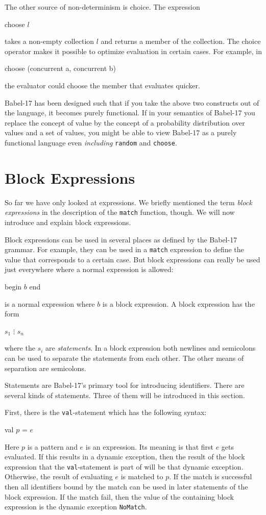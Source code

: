 \documentclass[11pt]{amsart}
\newcommand{\babelsrc}[1] {\lstinline!#1!}
\begin{document}
The other source of non-determinism is choice. The expression
\begin{babellisting}
choose $l$
\end{babellisting}
takes a non-empty collection $l$ and returns a member of the collection. The choice operator makes it possible to optimize evaluation in certain cases. For example, in 
\begin{babellisting}
choose (concurrent a, concurrent b)
\end{babellisting}
the evaluator could choose the member that evaluates quicker.

Babel-17 has been designed such that if you take the above two constructs out of the language, it becomes purely functional. If in your semantics of Babel-17 you replace the concept of value by the concept of a probability distribution over values and a set of values, you might be able to view Babel-17 as a purely functional language even \emph{including} \babelsrc{random} and \babelsrc{choose}.

\section{Block Expressions}
So far we have only looked at expressions. We briefly mentioned the term \emph{block expressions} in the description of the \babelsrc{match} function, though.  We will now introduce and explain block expressions.

Block expressions can be used in several places as defined by the Babel-17 grammar. For example, they can be used in a \babelsrc{match} expression to define the value that corresponds to a certain case. But block expressions can really be used just everywhere where a normal expression is allowed: 
\begin{babellisting}
begin
  $b$
end
\end{babellisting}
is a normal expression where $b$ is a block expression. A block expression has the form
\begin{babellisting}
$s_1$
$\vdots$
$s_n$
\end{babellisting}
where the $s_i$ are \emph{statements}. In a block expression both newlines and semicolons can be used to separate the statements from each other. The other means of separation are semicolons.

Statements are Babel-17's primary tool for introducing identifiers. There are several kinds of statements. Three of them will be introduced in this section.

First, there is the \babelsrc{val}-statement which has the following syntax:
\begin{babellisting}
val $p$ = $e$
\end{babellisting}
Here $p$ is a pattern and $e$ is an expression. Its meaning is that first $e$ gets evaluated. If this results in a dynamic exception, then the result of the block expression that the \babelsrc{val}-statement is part of will be that dynamic exception. Otherwise, the result of evaluating $e$ is matched to $p$. If the match is successful then all identifiers bound by the match can be used in later statements of the block expression. If the match fail, then the value of the containing block expression is the dynamic exception \babelsrc{NoMatch}.
\end{document}
